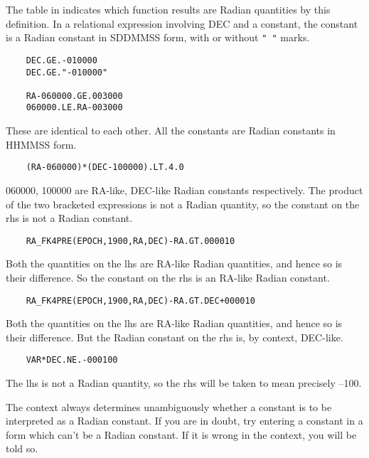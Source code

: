 The table in indicates which function results are Radian quantities by
this definition.
In a relational expression involving DEC and a constant, the constant is a
Radian constant in SDDMMSS form, with or without {\tt " "} marks.
\begin{verbatim}
    DEC.GE.-010000
    DEC.GE."-010000"

    RA-060000.GE.003000
    060000.LE.RA-003000
\end{verbatim}
These are identical to each other.
All the constants are Radian constants in HHMMSS form.
\begin{verbatim}
    (RA-060000)*(DEC-100000).LT.4.0
\end{verbatim}
060000, 100000 are RA-like, DEC-like Radian constants respectively.
The product of the two bracketed expressions is not a Radian quantity, so the
constant on the rhs is not a Radian constant.
\begin{verbatim}
    RA_FK4PRE(EPOCH,1900,RA,DEC)-RA.GT.000010
\end{verbatim}
Both the quantities on the lhs are RA-like Radian quantities, and hence so is
their difference.
So the constant on the rhs is an RA-like Radian constant.
\begin{verbatim}
    RA_FK4PRE(EPOCH,1900,RA,DEC)-RA.GT.DEC+000010
\end{verbatim}
Both the quantities on the lhs are RA-like Radian quantities, and hence so is
their difference.
But the Radian constant on the rhs is, by context, DEC-like.
\begin{verbatim}
    VAR*DEC.NE.-000100
\end{verbatim}
The lhs is not a Radian quantity, so the rhs will be taken to mean precisely
--100.

The context always determines unambiguously whether a constant is to be
interpreted as a Radian constant.
If you are in doubt, try entering a constant in a form which can't be a Radian
constant.
If it is wrong in the context, you will be told so.
